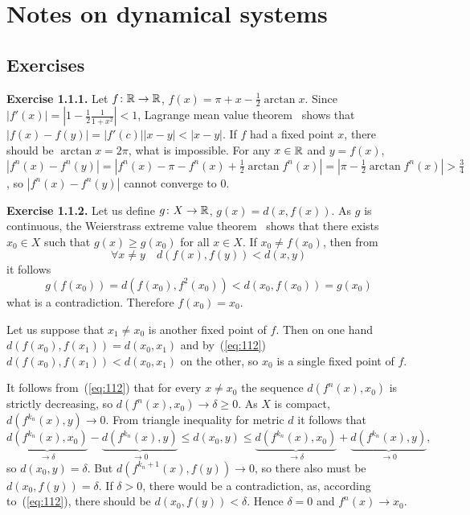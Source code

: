\chapter{Notes on dynamical systems}
\section{Exercises}

\textbf{Exercise 1.1.1.} Let $f \colon \mathbb{R} \to \mathbb{R}$, $f(x) = \pi
+ x - \frac{1}{2} \arctan x$. Since \( |f'(x)| = \left|1 - \frac{1}{2}
\frac{1}{1 + x^2}\right| < 1 \), Lagrange mean value theorem~\cite
     [p.~145] {rudnicki-2012} shows that \( |f(x) - f(y)| = |f'(c)||x
     - y| < |x - y| \). If $f$ had a fixed point $x$, there should be
     $\arctan x = 2\pi$, what is impossible. For any $x \in \mathbb{R}$
     and $y = f(x)$, \( |f^n(x) - f^n(y)| = |f^n(x) - \pi - f^n(x) +
     \frac{1}{2} \arctan f^n(x)| = |\pi - \frac{1}{2} \arctan f^n(x)|
     > \frac{3}{4} \), so \( |f^n(x) - f^n(y)| \) cannot converge to
     0.

\textbf{Exercise 1.1.2.} Let us define $g \colon X \to \mathbb{R}$, $g(x)
= d(x, f(x))$. As $g$ is continuous, the Weierstrass extreme value
theorem~\cite [p.~121] {rudnicki-2012} shows that there exists $x_0
\in X$ such that $g(x) \geq g(x_0)$ for all $x \in X$. If $x_0 \neq
f(x_0)$, then from
\begin{equation} \label{eq:112}
  \forall x \neq y \quad d(f(x), f(y)) < d(x, y)
\end{equation}
it follows \[ g(f(x_0)) = d(f(x_0), f^2(x_0)) < d(x_0, f(x_0)) =
g(x_0) \] what is a contradiction. Therefore $f(x_0) = x_0$.

Let us suppose that $x_1 \neq x_0$ is another fixed point of $f$. Then
on one hand $d(f(x_0), f(x_1)) = d(x_0, x_1)$ and by~(\ref{eq:112})
$d(f(x_0), f(x_1)) < d(x_0, x_1)$ on the other, so $x_0$ is a single
fixed point of $f$.

It follows from~(\ref{eq:112}) that for every $x \neq x_0$ the
sequence $d(f^n(x), x_0)$ is strictly decreasing, so $d(f^n(x), x_0)
\to \delta \geq 0$. As $X$ is compact, $d(f^{k_n}(x), y) \to 0$. From
triangle inequality for metric $d$ it follows that \[
\underbrace{d(f^{k_n}(x), x_0)}_{\to \delta} -
\underbrace{d(f^{k_n}(x), y)}_{\to 0} \leq d(x_0, y) \leq
\underbrace{d(f^{k_n}(x), x_0)}_{\to \delta} +
\underbrace{d(f^{k_n}(x), y)}_{\to 0}, \] so $d(x_0, y) = \delta$. But
$d(f^{k_n + 1}(x), f(y)) \to 0$, so there also must be $d(x_0, f(y)) =
\delta$. If $\delta > 0$, there would be a contradiction, as,
according to~(\ref{eq:112}), there should be $d(x_0, f(y)) < \delta$.
Hence $\delta = 0$ and $f^n(x) \to x_0$.

